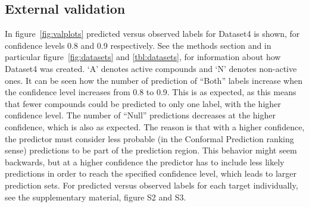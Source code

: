\documentclass[utf8]{frontiersSCNS} %
\begin{document}
\subsection{External validation}

In figure~\ref{fig:valplots} predicted versus observed labels for Dataset4 is
shown, for confidence levels 0.8 and 0.9 respectively. See the methods section
and in particular figure~\ref{fig:datasets} and \ref{tbl:datasets}, for
information about how Dataset4 was created. `A' denotes active
compounds and `N' denotes non-active ones. It can be seen how the number
of prediction of ``Both'' labels increase when the confidence level increases
from 0.8 to 0.9. This is as expected, as this means that fewer compounds
could be predicted to only one label, with the higher confidence level. The
number of ``Null'' predictions decreases at the higher confidence, which is
also as expected. The reason is that with a higher confidence, the predictor
must consider less probable (in the Conformal Prediction ranking sense)
predictions to be part of the prediction region. This behavior might seem
backwards, but at a higher confidence the predictor has to include less
likely predictions in order to reach the specified confidence level, which
leads to larger prediction sets. For predicted versus observed labels for
each target individually, see the supplementary material, figure S2 and S3.
\end{document}
